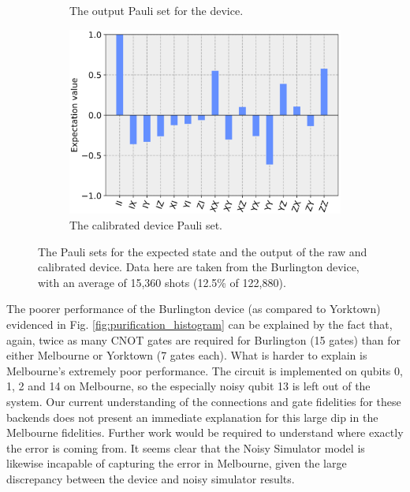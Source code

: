 \begin{figure}[h!]
\begin{subfigure}{.5\textwidth}
		\caption{The output Pauli set for the device.}
		\label{fig:pur_pauli_dev}
	\end{subfigure} \newline
	\begin{subfigure}{.5\textwidth}
    \centering
		\includegraphics[width=.8\linewidth]{images/results/pur_pauli_cal.png}
		\caption{The calibrated device Pauli set.}
		\label{fig:pur_pauli_cal}
	\end{subfigure}
	\caption{The Pauli sets for the expected state and the output of the raw and
    calibrated device. Data here are taken from the Burlington device, with an
    average of 15,360 shots (12.5\% of 122,880).}
	\label{fig:purification_paulis}
\end{figure}

The poorer performance of the Burlington device (as compared to Yorktown)
evidenced in Fig. \ref{fig:purification_histogram} can be explained by the fact
that, again, twice as many CNOT gates are required for Burlington (15 gates)
than for either Melbourne or Yorktown (7 gates each). What is harder to explain
is Melbourne's extremely poor performance. The circuit is implemented on qubits
0, 1, 2 and 14 on Melbourne, so the especially noisy qubit 13 is left out of the
system. Our current understanding of the connections and gate fidelities for
these backends does not present an immediate explanation for this large dip in
the Melbourne fidelities. Further work would be required to understand where
exactly the error is coming from. It seems clear that the Noisy Simulator model
is likewise incapable of capturing the error in Melbourne, given the large
discrepancy between the device and noisy simulator results.

